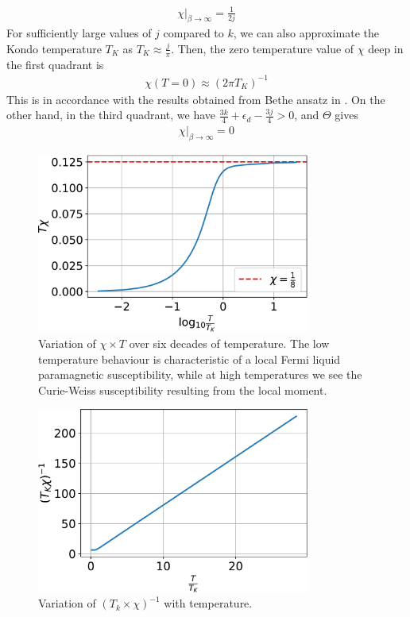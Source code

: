 \documentclass[12pt,twoside]{report}
\numberwithin{equation}{section}
\begin{document}
\begin{equation}\begin{aligned}
	\chi\vert_{\beta \to \infty} = \frac{1}{2j}
\end{aligned}\end{equation}
For sufficiently large values of \(j\) compared to \(k\), we can also approximate the Kondo temperature \(T_K\) as \(T_K \approx \frac{j}{\pi}\). Then, the zero temperature value of \(\chi\) deep in the first quadrant is
\begin{equation}\begin{aligned}
	\chi(T = 0) \approx \left(2 \pi T_K\right)^{-1}
\end{aligned}\end{equation}
This is in accordance with the results obtained from Bethe ansatz in \cite{okiji_kawakami}.
\pb On the other hand, in the third quadrant, we have \(\frac{3k}{4} + \epsilon_d - \frac{3j}{4} > 0\), and \(\Theta\) gives
\begin{equation}\begin{aligned}
	\chi\vert_{\beta \to \infty} = 0
\end{aligned}\end{equation}
\begin{figure}[htpb!]
	\centering
	\includegraphics[width=0.8\textwidth]{../figures/chi_T.pdf}
	\caption{Variation of $\chi \times T$ over six decades of temperature. The low temperature behaviour is characteristic of a local Fermi liquid paramagnetic susceptibility, while at high temperatures we see the Curie-Weiss susceptibility resulting from the local moment.}
\end{figure}
\begin{figure}[htpb!]
	\centering
	\includegraphics[width=0.8\textwidth]{../figures/one_over_chi.pdf}
	\caption{Variation of \(\left(T_k \times \chi\right)^{-1}\) with temperature.}
\end{figure}
\end{document}

